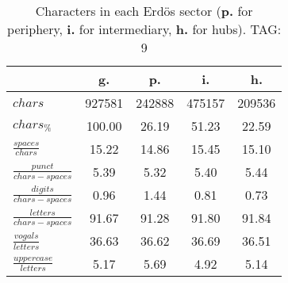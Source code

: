 \begin{table}[h!]
\begin{center}
\begin{tabular}{| l || c | c | c | c |}\hline
 & {\bf g.} & {\bf p.} & {\bf i.} & {\bf h.} \\\hline\hline
$chars$ & 927581  & 242888  & 475157  & 209536 \\
$chars_{\%}$ & 100.00  & 26.19  & 51.23  & 22.59 \\\hline
$\frac{spaces}{chars}$ & 15.22  & 14.86  & 15.45  & 15.10 \\
$\frac{punct}{chars-spaces}$ & 5.39  & 5.32  & 5.40  & 5.44 \\
$\frac{digits}{chars-spaces}$ & 0.96  & 1.44  & 0.81  & 0.73 \\\hline
$\frac{letters}{chars-spaces}$ & 91.67  & 91.28  & 91.80  & 91.84 \\
$\frac{vogals}{letters}$ & 36.63  & 36.62  & 36.69  & 36.51 \\
$\frac{uppercase}{letters}$ & 5.17  & 5.69  & 4.92  & 5.14 \\\hline
\end{tabular}
\caption{Characters in each Erd\"os sector ({{\bf p.}} for periphery, {{\bf i.}} for intermediary, 
    {{\bf h.}} for hubs). TAG: 9}
\end{center}
\end{table}